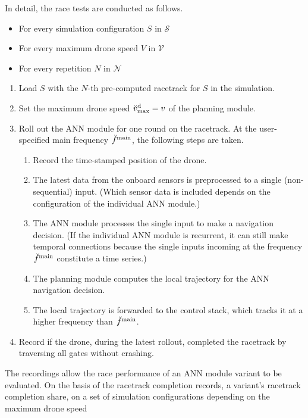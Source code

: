 In detail, the race tests are conducted as follows.
\begin{itemize}
    \item For every simulation configuration $S$ in $\mathcal{S}$
    \item For every maximum drone speed $V$ in $\mathcal{V}$
    \item For every repetition $N$ in $\mathcal{N}$
\end{itemize}
\begin{enumerate}
    \item Load $S$ with the $N$-th pre-computed racetrack for $S$ in the simulation.
    \item Set the maximum drone speed $\speed[\user]{\drone}{\mxm}{}{} = v$
    of the planning module.
    \item Roll out the ANN module for one round on the racetrack.
    At the user-specified main frequency $\freq[\user]{\main}{}{}{}$, 
    the following steps are taken.
    \begin{enumerate}
        \item Record the time-stamped position of the drone.
        \item The latest data from the onboard sensors is preprocessed
        to a single (non-sequential) input.
        (Which sensor data is included depends on the configuration of the individual ANN module.)
        \item The ANN module processes the single input
        to make a navigation decision. 
        (If the individual ANN module is recurrent, it can still make temporal connections
        because the single inputs incoming at the frequency $\freq[\user]{\main}{}{}{}$
        constitute a time series.)
        \item The planning module computes the local trajectory for the ANN navigation decision.
        \item The local trajectory is forwarded to the control stack,
        which tracks it at a higher frequency than $\freq[\user]{\main}{}{}{}$.
    \end{enumerate}
    \item Record if the drone, during the latest rollout, 
    completed the racetrack
    by traversing all gates without crashing. 
\end{enumerate}
The recordings allow the race performance 
of an ANN module variant to be evaluated.
On the basis of the racetrack completion records,
a variant's racetrack completion share,
on a set of simulation configurations 
depending on the maximum drone speed

